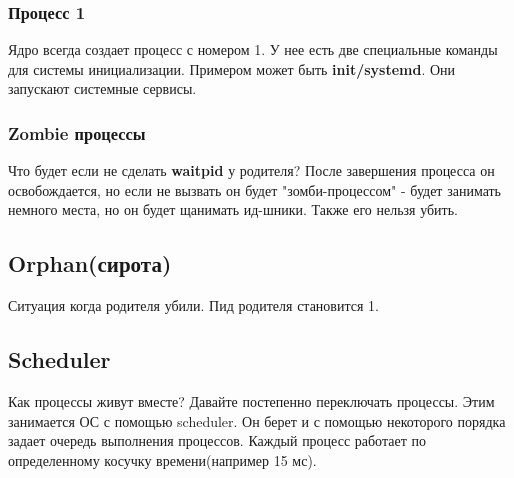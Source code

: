 \documentclass[12pt, a4paper]{scrartcl}
\begin{document}
			\subsubsection {Процесс 1}
				Ядро всегда создает процесс с номером 1. У нее есть две специальные команды для системы инициализации. Примером может быть \textbf{init/systemd}. Они запускают системные сервисы.
			\subsubsection {Zombie процессы}
				Что будет если не сделать \textbf{waitpid} у родителя? После завершения процесса он освобождается, но если не вызвать он будет "зомби-процессом" - будет занимать немного места, но он будет щанимать ид-шники. Также его нельзя убить.
			\subsection{Orphan(сирота)}
				Ситуация когда родителя убили. Пид родителя становится 1.
		\subsection{Scheduler}
			Как процессы живут вместе? Давайте постепенно переключать процессы. Этим занимается ОС с помощью scheduler. Он берет и с помощью некоторого порядка задает очередь выполнения процессов. Каждый процесс работает по определенному косучку времени(например 15 мс).
			
				
				
\end{document}
